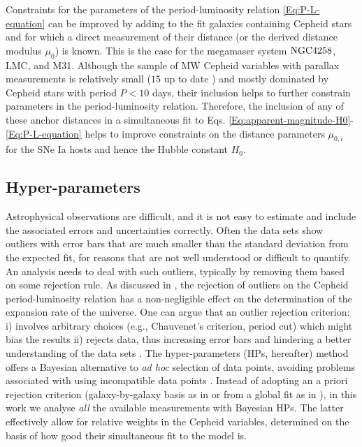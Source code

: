 Constraints for the parameters of the period-luminosity relation \eqref{Eq:P-L-equation} can be improved by adding to the fit galaxies containing Cepheid stars and for which a direct measurement of their distance (or the derived distance modulus $\mu_0$) is known. This is the case for the megamaser system $\mathrm{NGC4258}$, LMC, and M31. Although the sample of MW Cepheid variables with parallax measurements is relatively small ($15$ up to date \cite{Riess:2016jrr}) and mostly dominated by Cepheid stars with period $P<10$ days, their inclusion helps to further constrain parameters in the period-luminosity relation. Therefore, the inclusion of any of these anchor distances in a simultaneous fit to Eqs. \eqref{Eq:apparent-magnitude-H0}-\eqref{Eq:P-L-equation} helps to improve constraints on the distance parameters $\mu_{0,i}$ for the SNe Ia hosts and hence the Hubble constant $H_0$. 

\subsection{Hyper-parameters}

Astrophysical observations are difficult, and it is not easy to estimate and include the associated errors and uncertainties correctly. Often the data sets show outliers with error bars that are much smaller than the standard deviation from the expected fit, for reasons that are not well understood or difficult to quantify. An analysis needs to deal with such outliers, typically by removing them based on some rejection rule.
As discussed in \cite{Riess:2009pu,Riess:2011yx,Efstathiou:2013via}, the rejection of outliers on the Cepheid period-luminosity relation has a non-negligible effect on the determination of the expansion rate of the universe. One can argue that an outlier rejection criterion: i) involves arbitrary choices (e.g., Chauvenet's criterion, period cut) which might bias the results ii) rejects data, thus increasing error bars and hindering a better understanding of the data sets \cite{Press:1996fw}. The hyper-parameters (HPs, hereafter) method offers a Bayesian alternative to {\em{ad hoc}} selection of data points, avoiding problems associated with using incompatible data points \cite{Lahav:1999hu}. Instead of adopting an a priori rejection criterion  (galaxy-by-galaxy basis as in \cite{Riess:2009pu,Riess:2011yx} or from a global fit as in \cite{Efstathiou:2013via}), in this work we analyse {\em all} the available measurements with Bayesian HPs. The latter effectively allow for relative weights in the Cepheid variables, determined on the basis of how good their simultaneous fit to the model is. 

